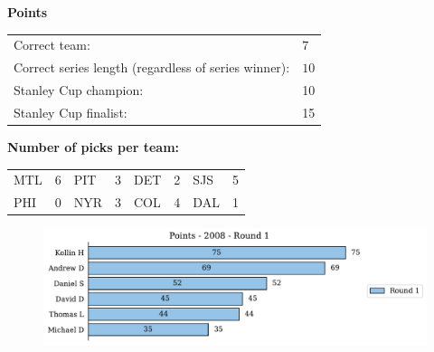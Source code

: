 \documentclass[10pt]{article}
\begin{document}
{\bf Points}\\
\begin{minipage}{12cm}
    \begin{tabular}{l l}
        Correct team:	& $7$\\
        Correct series length (regardless of series winner):	& $10$\\
        Stanley Cup champion:	& 10\\
        Stanley Cup finalist:	& 15\\
    \end{tabular}

    \vspace{1cm}
    {\bf Number of picks per team:}\\
    \begin{tabular}{lc | lc | lc | lc }
        MTL & 6 & PIT & 3 & DET & 2 & SJS & 5 \\
        PHI & 0 & NYR & 3 & COL & 4 & DAL & 1 \\
    \end{tabular}
\end{minipage}
\begin{minipage}[t]{13cm}
    \begin{figure}[H]
        \vspace{-3cm}
        \includegraphics[width=13cm]{../../figures/2008/Points-2008-Round1.pdf}
    \end{figure}
\end{minipage}
\end{document}
